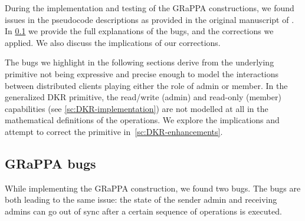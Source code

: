 During the implementation and testing of the GRaPPA constructions,
we found issues in the pseudocode descriptions as provided
in the original manuscript of \cite{GKP}.
In \cref{sc:GRaPPA-bugs} we provide the full explanations of the bugs, 
and the corrections we applied. 
We also discuss the implications of our corrections. 

The bugs we highlight in the following sections
derive from the underlying primitive not being expressive and
precise enough to model the interactions between distributed clients
playing either the role of admin or member.
In the generalized DKR primitive, the read/write (admin) 
and read-only (member) capabilities (see \cref{sc:DKR-implementation})
are not modelled at all in the mathematical definitions of the operations.
We explore the implications and attempt to correct
the primitive in~\cref{sc:DKR-enhancements}.

\subsection{GRaPPA bugs}\label{sc:GRaPPA-bugs}

While implementing the GRaPPA construction, we found two bugs.
The bugs are both leading to the same issue: the state of the
sender admin and receiving admins can go out of sync after a certain
sequence of operations is executed.

